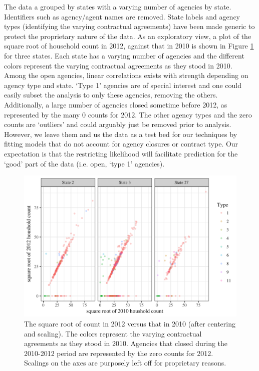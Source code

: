 \documentclass[12pt]{article}
\begin{document}
The data a grouped by states with a varying number of agencies by state. Identifiers such as agency/agent names are removed. State labels and agency types (identifying the varying contractual agreements) have been made generic to protect the proprietary nature of the data.
As an exploratory view, a plot of the square root of household count in 2012, against that in 2010 
is shown in Figure \ref{fig:ctVct} for three states. Each state has a varying number of agencies and  the different colors represent the varying contractual agreements as they stood in 2010.  Among the open agencies, linear correlations exists with strength depending on agency type and state.  `Type 1' agencies are of special interest and one could easily subset the analysis to only these agencies, removing the others. Additionally, a large number of agencies closed sometime before 2012, as represented by the many $0$ counts for 2012. The other agency types and the zero counts are `outliers' and could arguably just be removed prior to analysis. However,  we leave them and us the data as a test bed for our techniques by fitting models that do not account for agency closures or contract type.  Our expectation is that the restricting likelihood will facilitate prediction for the `good' part of the data (i.e. open, `type 1' agencies). 

\begin{figure}[H]
\centering
\includegraphics[width=6in]{scatter_by_state.png}
\caption{The square root of count in 2012 versus that in 2010 (after centering and scaling). The colors represent the varying contractual agreements as they stood in 2010.  Agencies that closed during the 2010-2012 period are represented by the zero counts for 2012. Scalings on the axes are purposely left off for proprietary reasons.}
\label{fig:ctVct}
\end{figure}
\end{document}
